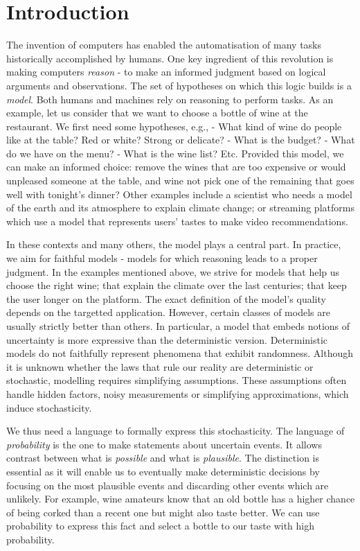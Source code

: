 \section{Introduction}
The invention of computers has enabled the automatisation of many tasks historically accomplished by humans. One key ingredient of this revolution is making computers \textit{reason} - to make an informed judgment based on logical arguments and observations. The set of hypotheses on which this logic builds is a \textit{model}. Both humans and machines rely on reasoning to perform tasks. As an example, let us consider that we want to choose a bottle of wine at the restaurant. We first need some hypotheses, e.g., - What kind of wine do people like at the table? Red or white? Strong or delicate? - What is the budget? - What do we have on the menu? - What is the wine list? Etc. Provided this model, we can make an informed choice: remove the wines that are too expensive or would unpleased someone at the table, and wine not pick one of the remaining that goes well with tonight's dinner? Other examples include a scientist who needs a model of the earth and its atmosphere to explain climate change; or streaming platforms which use a model that represents users' tastes to make video recommendations.

In these contexts and many others, the model plays a central part. In practice, we aim for faithful models - models for which reasoning leads to a proper judgment. In the examples mentioned above, we strive for models that help us choose the right wine; that explain the climate over the last centuries; that keep the user longer on the platform. The exact definition of the model's quality depends on the targetted application. However, certain classes of models are usually strictly better than others.
In particular, a model that embeds notions of uncertainty is more expressive than the deterministic version. Deterministic models do not faithfully represent phenomena that exhibit randomness. Although it is unknown whether the laws that rule our reality are deterministic or stochastic, modelling requires simplifying assumptions. These assumptions often handle hidden factors, noisy measurements or simplifying approximations, which induce stochasticity.

We thus need a language to formally express this stochasticity. The language of \textit{probability} is the one to make statements about uncertain events. It allows contrast between what is \textit{possible} and what is \textit{plausible}. The distinction is essential as it will enable us to eventually make deterministic decisions by focusing on the most plausible events and discarding other events which are unlikely. For example, wine amateurs know that an old bottle has a higher chance of being corked than a recent one but might also taste better. We can use probability to express this fact and select a bottle to our taste with high probability.

